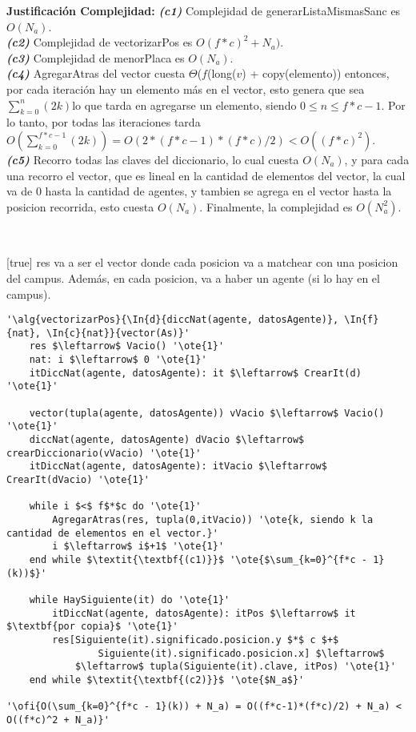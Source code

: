 \textbf{Justificación Complejidad:} \textit{\textbf{(c1)}} Complejidad de generarListaMismasSanc es $O(N_a)$. \\
\textit{\textbf{(c2)}} Complejidad de vectorizarPos es $O(f*c)^2 + N_a)$. \\
\textit{\textbf{(c3)}} Complejidad de menorPlaca es $O(N_a)$. \\
\textit{\textbf{(c4)}} AgregarAtras del vector cuesta $\Theta$($f$(long($v$) + copy(elemento)) entonces, por cada iteración hay un elemento más en el vector, esto genera que sea $\sum_{k=0}^{n}(2k)$lo que tarda en agregarse un elemento, siendo $0\leq n \leq f*c-1$. Por lo tanto, por todas las iteraciones tarda $O(\sum_{k=0}^{f*c - 1}(2k)) = O(2*(f*c-1)*(f*c)/2) < O((f*c)^2)$.\\
\textit{\textbf{(c5)}} Recorro todas las claves del diccionario, lo cual cuesta $O(N_a)$, y para cada una recorro el vector, que es lineal en la cantidad de elementos del vector, la cual va de 0 hasta la cantidad de agentes, y tambien se agrega en el vector hasta la posicion recorrida, esto cuesta $O(N_a)$. Finalmente, la complejidad es $O(N_a^2)$.

~

[true]
{res va a ser el vector donde cada posicion va a matchear con una posicion del campus. Además, en cada posicion, va a haber un agente (si lo hay en el campus).}


\begin{lstlisting}[mathescape]
'\alg{vectorizarPos}{\In{d}{diccNat(agente, datosAgente)}, \In{f}{nat}, \In{c}{nat}}{vector(As)}'
	res $\leftarrow$ Vacio() '\ote{1}'
	nat: i $\leftarrow$ 0 '\ote{1}'
	itDiccNat(agente, datosAgente): it $\leftarrow$ CrearIt(d) '\ote{1}'

	vector(tupla(agente, datosAgente)) vVacio $\leftarrow$ Vacio() '\ote{1}'
	diccNat(agente, datosAgente) dVacio $\leftarrow$ crearDiccionario(vVacio) '\ote{1}'
	itDiccNat(agente, datosAgente): itVacio $\leftarrow$ CrearIt(dVacio) '\ote{1}'

	while i $<$ f$*$c do '\ote{1}'
		AgregarAtras(res, tupla(0,itVacio)) '\ote{k, siendo k la cantidad de elementos en el vector.}'
		i $\leftarrow$ i$+1$ '\ote{1}'
	end while $\textit{\textbf{(c1)}}$ '\ote{$\sum_{k=0}^{f*c - 1}(k))$}'

	while HaySiguiente(it) do '\ote{1}'
		itDiccNat(agente, datosAgente): itPos $\leftarrow$ it $\textbf{por copia}$ '\ote{1}'
		res[Siguiente(it).significado.posicion.y $*$ c $+$
				Siguiente(it).significado.posicion.x] $\leftarrow$
			$\leftarrow$ tupla(Siguiente(it).clave, itPos) '\ote{1}'
	end while $\textit{\textbf{(c2)}}$ '\ote{$N_a$}'

'\ofi{O(\sum_{k=0}^{f*c - 1}(k)) + N_a) = O((f*c-1)*(f*c)/2) + N_a) < O((f*c)^2 + N_a)}'
\end{lstlisting}

